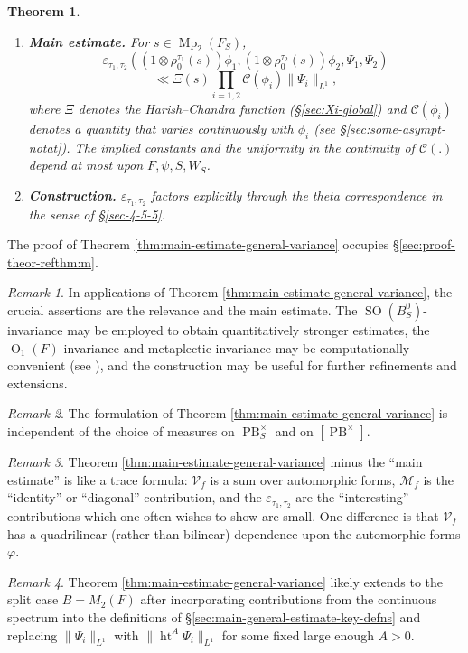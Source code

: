 \documentclass[reqno,10pt]{amsart}
\theoremstyle{plain} %
\newtheorem{theorem}             {Theorem}
\theoremstyle{definition}
\theoremstyle{plain} %
\theoremstyle{remark}
\newtheorem{remark}             {Remark}
\theoremstyle{itplain} %
\theoremstyle{remark} %
\numberwithin{equation}{section}
\DeclareMathOperator{\Mp}{Mp}
\DeclareMathOperator{\htt}{ht}
\DeclareMathOperator{\SO}{SO}
\def\eps{\varepsilon}
\def\PB{\operatorname{PB}}
\def\Sob{\mathcal{C}}
\def\O{\operatorname{O}}
\begin{document}
\begin{theorem}
\begin{enumerate}
  \item {\bf Main estimate.}  For $s \in \Mp_2(F_S)$,
    \[
      \eps_{\tau_1,\tau_2}((1 \otimes \rho_0^{\tau_1}(s)) \phi_1, (1 \otimes \rho_0^{\tau_2}(s)) \phi_2, \Psi_1, \Psi_2) \]
    \[
      \ll \Xi(s) \prod_{i=1,2} \Sob(\phi_i) \|\Psi_i\|_{L^1},
    \]
    where $\Xi$ denotes the Harish--Chandra function (\S\ref{sec:Xi-global}) and $\Sob(\phi_i)$ denotes a quantity that varies continuously with $\phi_i$ (see \S\ref{sec:some-asympt-notat}).  The implied constants and the uniformity in the continuity of $\Sob(.)$
    depend at most upon $F,\psi,S,W_S$.
  \item {\bf Construction.}  $\eps_{\tau_1,\tau_2}$ factors explicitly through the theta correspondence in the sense of \S\ref{sec-4-5-5}.
  \end{enumerate}
\end{theorem}
The proof of Theorem \ref{thm:main-estimate-general-variance} occupies \S\ref{sec:proof-theor-refthm:m}.

\begin{remark}
  In applications of Theorem \ref{thm:main-estimate-general-variance}, the crucial assertions are the relevance and the main estimate.  The $\SO(B_S^0)$-invariance may be employed to obtain quantitatively stronger estimates, the $\O_1(F)$-invariance and metaplectic invariance may be computationally convenient (see \cite{nelson-variance-II}), and the construction may be useful for further refinements and extensions.
\end{remark}
\begin{remark}
  The formulation of Theorem \ref{thm:main-estimate-general-variance} is independent of the choice of measures on $\PB_S^\times$ and on $[\PB^\times]$.
\end{remark}
\begin{remark}
  Theorem \ref{thm:main-estimate-general-variance} minus the ``main estimate'' is like a trace formula: $\mathcal{V}_f$ is a sum over automorphic forms, $\mathcal{M}_f$ is the ``identity'' or ``diagonal'' contribution, and the $\eps_{\tau_1,\tau_2}$ are the ``interesting'' contributions which one often wishes to show are small.  One difference is that $\mathcal{V}_f$ has a quadrilinear (rather than bilinear) dependence upon the automorphic forms $\varphi$.
\end{remark}
\begin{remark}
  Theorem \ref{thm:main-estimate-general-variance} likely extends to the split case $B = M_2(F)$ after incorporating contributions from the continuous spectrum into the definitions of \S\ref{sec:main-general-estimate-key-defns} and replacing $\|\Psi_i\|_{L^1}$ with $\|\htt^A \Psi_i\|_{L^1}$ for some fixed large enough $A > 0$.
\end{remark}
\end{document}
